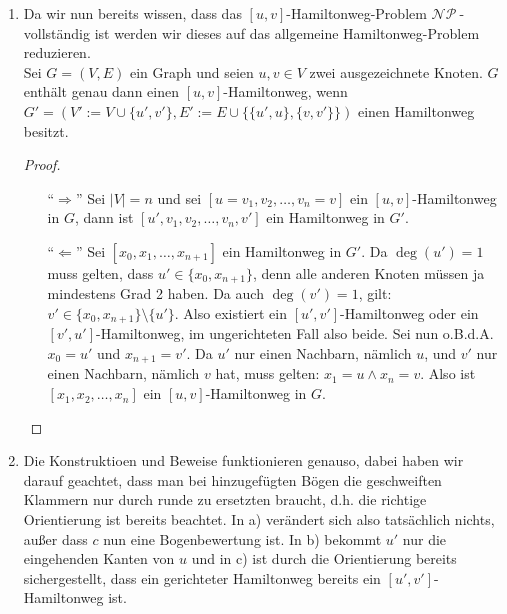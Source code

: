 \documentclass[a4paper,10pt,german]{scrartcl}
\newcommand{\NP}{\ensuremath{\mathcal{NP\ }}}
\newcommand{\ra}{\Rightarrow}
\begin{document}
\begin{enumerate}
\begin{proof}
 \end{proof}
 \item Da wir nun bereits wissen, dass das $[u,v]$-Hamiltonweg-Problem \NP-vollständig ist werden wir dieses auf das allgemeine Hamiltonweg-Problem reduzieren.\\
 Sei $G=(V,E)$ ein Graph und seien $u,v\in V$ zwei ausgezeichnete Knoten. $G$ enthält genau dann einen $[u,v]$-Hamiltonweg, wenn $G'=(V':=V\cup\{u',v'\},E':=E\cup\{\{u',u\},\{v,v'\}\})$ einen Hamiltonweg besitzt.
 \begin{proof}~
   \begin{itemize}
    \item[``$\ra$''] Sei $|V|=n$ und sei $[u=v_1,v_2,\dots,v_n=v]$ ein $[u,v]$-Hamiltonweg in $G$, dann ist $[u',v_1,v_2,\dots,v_n,v']$ ein Hamiltonweg in $G'$.
    \item[``$\Leftarrow$''] Sei $[x_0,x_1,\dots,x_{n+1}]$ ein Hamiltonweg in $G'$. Da $\deg(u')=1$ muss gelten, dass $u'\in\{x_0,x_{n+1}\}$, denn alle anderen Knoten müssen ja mindestens Grad 2 haben. Da auch $\deg(v')=1$, gilt:
    $v'\in \{x_0,x_{n+1}\}\setminus \{u'\}$. Also existiert ein $[u',v']$-Hamiltonweg oder ein $[v',u']$-Hamiltonweg, im ungerichteten Fall also beide. Sei nun o.B.d.A. $x_0=u'$ und $x_{n+1}=v'$.
    Da $u'$ nur einen Nachbarn, nämlich $u$, und $v'$ nur einen Nachbarn, nämlich $v$ hat, muss gelten: $x_1=u\wedge x_n=v$. Also ist $[x_1,x_2,\dots,x_n]$ ein $[u,v]$-Hamiltonweg in $G$.
   \end{itemize}
  \end{proof}
  \item Die Konstruktioen und Beweise funktionieren genauso, dabei haben wir darauf geachtet, dass man bei hinzugefügten Bögen die geschweiften Klammern nur
  durch runde zu ersetzten braucht, d.h. die richtige Orientierung ist bereits beachtet. In a) verändert sich also tatsächlich nichts, außer dass $c$ nun eine Bogenbewertung ist.
  In b) bekommt $u'$ nur die eingehenden Kanten von $u$ und in c) ist durch die Orientierung bereits sichergestellt, dass ein gerichteter Hamiltonweg bereits ein $[u',v']$-Hamiltonweg ist.
\end{enumerate}
\end{document}

